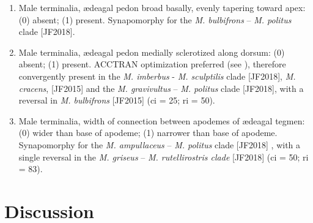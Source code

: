 \documentclass[fleqn,10pt,lineno]{wlpeerj} %
\begin{document}
\begin{enumerate}
		\item Male terminalia, {\ae}deagal pedon broad basally, evenly tapering toward apex: (0) absent; (1) present. Synapomorphy for the \textit{M. bulbifrons} – \textit{M. politus} clade [JF2018].
		
		\item Male terminalia, {\ae}deagal pedon medially sclerotized along dorsum: (0) absent; (1) present. ACCTRAN optimization preferred (see \citealt{agnarsson2008}), therefore convergently present in the \textit{M. imberbus} - \textit{M. sculptilis} clade [JF2018], \textit{M. cracens}, [JF2015] and the \textit{M. gravivultus} – \textit{M. politus} clade [JF2018], with a reversal in \textit{M. bulbifrons} [JF2015] (ci = 25; ri = 50).
		
		\item Male terminalia, width of connection between apodemes of {\ae}deagal tegmen: (0) wider than base of apodeme; (1) narrower than base of apodeme. Synapomorphy for the \textit{M. ampullaceus} – \textit{M. politus} clade [JF2018] , with a single reversal in the \textit{M. griseus} – \textit{M. rutellirostris clade} [JF2018] (ci = 50; ri = 83).
	\end{enumerate}

\section*{Discussion}\label{sec:disc}
\end{document}
